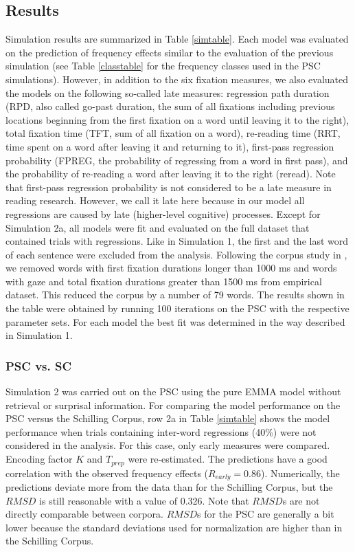 \documentclass{cambridge7A}\usepackage[]{graphicx}\usepackage[]{color}
\begin{document}
\subsection{Results}
Simulation results are summarized in Table \ref{simtable}.  Each model was evaluated on the prediction of frequency effects similar to the evaluation of the previous simulation (see Table \ref{classtable} for the frequency classes used in the PSC simulations). However, in addition to the six fixation measures, we also evaluated the models on the following so-called late measures:  regression path duration (RPD, also called go-past duration, the sum of all fixations including previous locations beginning from the first fixation on a word until leaving it to the right),  total fixation time (TFT, sum of all fixation on a word),  re-reading time (RRT, time spent on a word after leaving it and returning to it),  first-pass regression probability  (FPREG, the probability of regressing from a word in first pass), and the probability of re-reading a word after leaving it to the right (reread).  Note that first-pass regression probability is not considered to be a late measure in reading research.  However, we call it late here because in our model all regressions are caused by late (higher-level cognitive) processes.
Except for Simulation 2a, all models were fit and evaluated on the full dataset that contained trials with regressions.  
Like in Simulation 1, the first and the last word of each sentence were excluded from the analysis.  Following the corpus study in \cite{Kliegl2004}, we removed words with first fixation durations longer than 1000 ms and words with gaze and total fixation durations greater than 1500 ms from empirical dataset. This reduced the corpus by a number of 79 words. The results shown in the table were obtained by running 100 iterations on the PSC with the respective parameter sets.
For each model the best fit was determined in the way described in Simulation 1.

\subsubsection{PSC vs. SC}
Simulation 2 was carried out on the PSC using the pure EMMA model without retrieval or surprisal information.
For comparing the model performance on the PSC versus the Schilling Corpus, row 2a in Table \ref{simtable} shows the model performance when trials containing inter-word regressions (40\%) were not considered in the analysis.  For this case, only early measures were compared.  Encoding factor $K$ and $T_{prep}$ were re-estimated.  The predictions have a good correlation with the observed frequency effects ($R_{early} = 0.86$).  Numerically, the predictions deviate more from the data than for the Schilling Corpus, but the $RMSD$ is still reasonable with a value of 0.326.  Note that $RMSD$s are not directly comparable between corpora.  $RMSD$s for the PSC are generally a bit lower because the standard deviations used for normalization are higher than in the Schilling Corpus.
\end{document}
